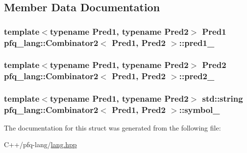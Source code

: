 \subsection{Member Data Documentation}
\hypertarget{structpfq__lang_1_1Combinator2_a65f2f5cef67e0525a504529bdb264ab3}{
\subsubsection[{pred1\+\_\+}]{\setlength{\rightskip}{0pt plus 5cm}template$<$typename Pred1, typename Pred2$>$ Pred1 {\bf pfq\+\_\+lang\+::\+Combinator2}$<$ Pred1, Pred2 $>$\+::pred1\+\_\+}}\label{structpfq__lang_1_1Combinator2_a65f2f5cef67e0525a504529bdb264ab3}
\hypertarget{structpfq__lang_1_1Combinator2_a32669787a9dc32693db9813e1e5b7c0d}{
\subsubsection[{pred2\+\_\+}]{\setlength{\rightskip}{0pt plus 5cm}template$<$typename Pred1, typename Pred2$>$ Pred2 {\bf pfq\+\_\+lang\+::\+Combinator2}$<$ Pred1, Pred2 $>$\+::pred2\+\_\+}}\label{structpfq__lang_1_1Combinator2_a32669787a9dc32693db9813e1e5b7c0d}
\hypertarget{structpfq__lang_1_1Combinator2_a0fb906403163d6c600b7b86ff915900b}{
\subsubsection[{symbol\+\_\+}]{\setlength{\rightskip}{0pt plus 5cm}template$<$typename Pred1, typename Pred2$>$ std\+::string {\bf pfq\+\_\+lang\+::\+Combinator2}$<$ Pred1, Pred2 $>$\+::symbol\+\_\+}}\label{structpfq__lang_1_1Combinator2_a0fb906403163d6c600b7b86ff915900b}


The documentation for this struct was generated from the following file\+:\begin{DoxyCompactItemize}
\item 
C++/pfq-\/lang/\hyperlink{lang_8hpp}{lang.\+hpp}\end{DoxyCompactItemize}
